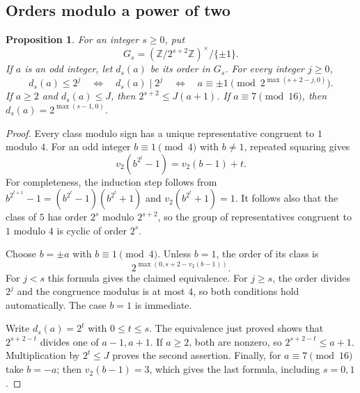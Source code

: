 \documentclass[11pt,a4paper]{article}
\newtheorem{proposition}{Proposition}[section]
\theoremstyle{remark}
\newcommand{\Z}{\mathbb Z}
\begin{document}
\subsection{Orders modulo a power of two}
\begin{proposition}
For an integer $s\ge0$, put
\[
 G_s=(\Z/2^{s+2}\Z)^\times/\{\pm1\}.
\]
If $a$ is an odd integer, let $d_s(a)$ be its order in $G_s$. For every integer $j\ge0$,
\[
 d_s(a)\le2^j
 \quad\Longleftrightarrow\quad d_s(a)\mid2^j
 \quad\Longleftrightarrow\quad
 a\equiv\pm1\pmod{2^{\max(s+2-j,0)}}.
\]
If $a\ge2$ and $d_s(a)\le J$, then $2^{s+2}\le J(a+1)$.
If $a\equiv7\pmod{16}$, then $d_s(a)=2^{\max(s-1,0)}$.
\end{proposition}
\begin{proof}
Every class modulo sign has a unique representative congruent to $1$ modulo $4$. For an odd integer $b\equiv1\pmod4$ with $b\ne1$, repeated squaring gives
\[
 v_2(b^{2^t}-1)=v_2(b-1)+t.
\]
For completeness, the induction step follows from
$b^{2^{t+1}}-1=(b^{2^t}-1)(b^{2^t}+1)$ and
$v_2(b^{2^t}+1)=1$. It follows also that the class of $5$ has order $2^s$ modulo $2^{s+2}$, so the group of representatives congruent to $1$ modulo $4$ is cyclic of order $2^s$.

Choose $b=\pm a$ with $b\equiv1\pmod4$. Unless $b=1$, the order of its class is
\[
 2^{\max(0,s+2-v_2(b-1))}.
\]
For $j<s$ this formula gives the claimed equivalence. For $j\ge s$, the order divides $2^j$ and the congruence modulus is at most $4$, so both conditions hold automatically. The case $b=1$ is immediate.

Write $d_s(a)=2^t$ with $0\le t\le s$. The equivalence just proved shows that $2^{s+2-t}$ divides one of $a-1,a+1$. If $a\ge2$, both are nonzero, so $2^{s+2-t}\le a+1$. Multiplication by $2^t\le J$ proves the second assertion. Finally, for $a\equiv7\pmod{16}$ take $b=-a$; then $v_2(b-1)=3$, which gives the last formula, including $s=0,1$.
\end{proof}
\end{document}
